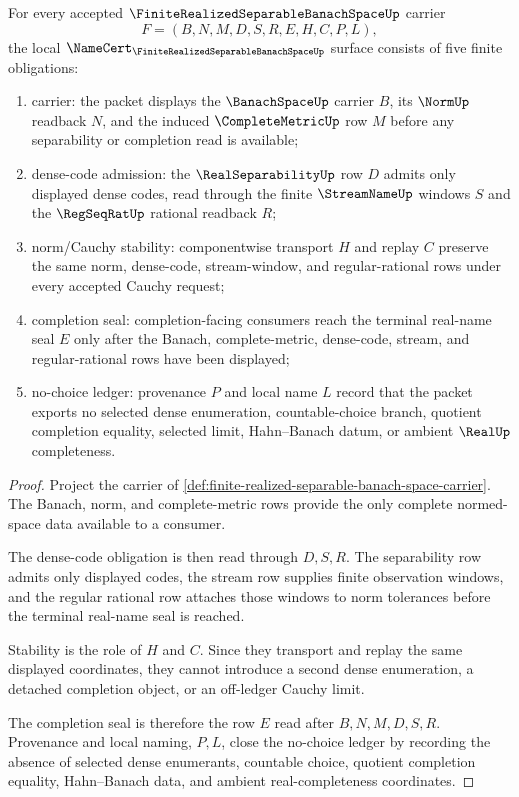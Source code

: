 \begin{theorem}
\label{thm:finite-realized-separable-banach-space-namecert-obligations}
For every accepted $\FiniteRealizedSeparableBanachSpaceUp$ carrier
$$
F=(B,N,M,D,S,R,E,H,C,P,L),
$$
the local $\NameCert_{\FiniteRealizedSeparableBanachSpaceUp}$ surface consists of five finite obligations:
\begin{enumerate}
\item carrier: the packet displays the $\BanachSpaceUp$ carrier $B$, its $\NormUp$ readback $N$, and the induced $\CompleteMetricUp$ row $M$ before any separability or completion read is available;
\item dense-code admission: the $\RealSeparabilityUp$ row $D$ admits only displayed dense codes, read through the finite $\StreamNameUp$ windows $S$ and the $\RegSeqRatUp$ rational readback $R$;
\item norm/Cauchy stability: componentwise transport $H$ and replay $C$ preserve the same norm, dense-code, stream-window, and regular-rational rows under every accepted Cauchy request;
\item completion seal: completion-facing consumers reach the terminal real-name seal $E$ only after the Banach, complete-metric, dense-code, stream, and regular-rational rows have been displayed;
\item no-choice ledger: provenance $P$ and local name $L$ record that the packet exports no selected dense enumeration, countable-choice branch, quotient completion equality, selected limit, Hahn--Banach datum, or ambient $\RealUp$ completeness.
\end{enumerate}
\end{theorem}
\begin{proof}
Project the carrier of \autoref{def:finite-realized-separable-banach-space-carrier}. The Banach, norm, and complete-metric rows provide the only complete normed-space data available to a consumer.

The dense-code obligation is then read through $D,S,R$. The separability row admits only displayed codes, the stream row supplies finite observation windows, and the regular rational row attaches those windows to norm tolerances before the terminal real-name seal is reached.

Stability is the role of $H$ and $C$. Since they transport and replay the same displayed coordinates, they cannot introduce a second dense enumeration, a detached completion object, or an off-ledger Cauchy limit.

The completion seal is therefore the row $E$ read after $B,N,M,D,S,R$. Provenance and local naming, $P,L$, close the no-choice ledger by recording the absence of selected dense enumerants, countable choice, quotient completion equality, Hahn--Banach data, and ambient real-completeness coordinates.
\end{proof}

